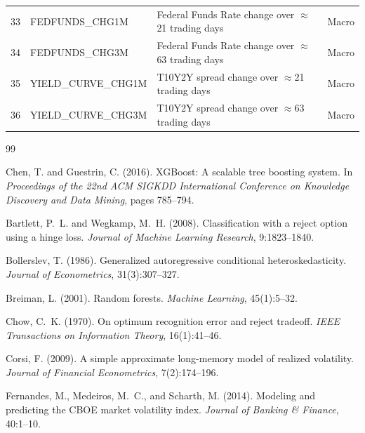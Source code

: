 \documentclass[12pt]{article}
\begin{document}
\begin{table}[H]
\begin{tabular}{llll}
\midrule
33 & FEDFUNDS\_CHG1M   & Federal Funds Rate change over $\approx$21 trading days    & Macro \\
34 & FEDFUNDS\_CHG3M   & Federal Funds Rate change over $\approx$63 trading days    & Macro \\
35 & YIELD\_CURVE\_CHG1M & T10Y2Y spread change over $\approx$21 trading days        & Macro \\
36 & YIELD\_CURVE\_CHG3M & T10Y2Y spread change over $\approx$63 trading days        & Macro \\
\bottomrule
\end{tabular}
\end{table}


\begin{thebibliography}{99}

Chen, T. and Guestrin, C. (2016).
\newblock XGBoost: A scalable tree boosting system.
\newblock In \emph{Proceedings of the 22nd ACM SIGKDD International Conference on Knowledge Discovery and Data Mining}, pages 785--794.

Bartlett, P.~L. and Wegkamp, M.~H. (2008).
\newblock Classification with a reject option using a hinge loss.
\newblock \emph{Journal of Machine Learning Research}, 9:1823--1840.

Bollerslev, T. (1986).
\newblock Generalized autoregressive conditional heteroskedasticity.
\newblock \emph{Journal of Econometrics}, 31(3):307--327.

Breiman, L. (2001).
\newblock Random forests.
\newblock \emph{Machine Learning}, 45(1):5--32.

Chow, C.~K. (1970).
\newblock On optimum recognition error and reject tradeoff.
\newblock \emph{IEEE Transactions on Information Theory}, 16(1):41--46.

Corsi, F. (2009).
\newblock A simple approximate long-memory model of realized volatility.
\newblock \emph{Journal of Financial Econometrics}, 7(2):174--196.

Fernandes, M., Medeiros, M.~C., and Scharth, M. (2014).
\newblock Modeling and predicting the CBOE market volatility index.
\newblock \emph{Journal of Banking \& Finance}, 40:1--10.


\end{thebibliography}
\end{document}
